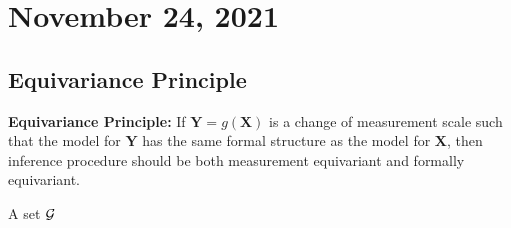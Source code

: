 \section{November 24, 2021}
\subsection{Equivariance Principle}
\textbf{Equivariance Principle:} If $\boldsymbol{Y} = g(\boldsymbol{X})$ is a change of measurement scale such that the model for $\boldsymbol{Y}$ has the same formal structure as the model for $\boldsymbol{X}$,  then inference procedure should be both measurement equivariant and formally equivariant. 
\begin{definition}
    A set $\mathcal G$
\end{definition}